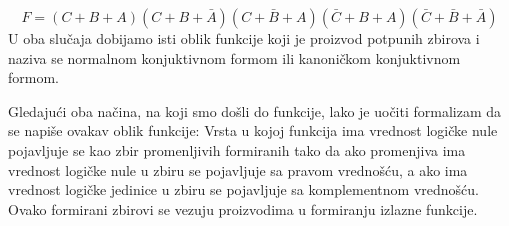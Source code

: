 \begin{frame}[label=02-s017]
\gusttekst
\[
F=(C+B+A)(C+B+\bar A)(C+\bar B+A)(\bar C+B+A)(\bar C+\bar B+\bar A)
\]
U oba slučaja dobijamo isti oblik funkcije koji je \alert{proizvod potpunih zbirova} i naziva se \alert{normalnom konjuktivnom formom} ili \alert{kanoničkom konjuktivnom formom}.

Gledajući oba načina, na koji smo došli do funkcije, lako je uočiti formalizam da se napiše ovakav oblik funkcije: Vrsta u kojoj funkcija ima vrednost logičke nule pojavljuje se kao zbir promenljivih formiranih tako da ako promenjiva ima vrednost logičke nule u zbiru se pojavljuje sa pravom vrednošću, a ako ima vrednost logičke jedinice u zbiru se pojavljuje sa komplementnom vrednošću. Ovako formirani zbirovi se vezuju proizvodima u formiranju izlazne funkcije.
\end{frame}
